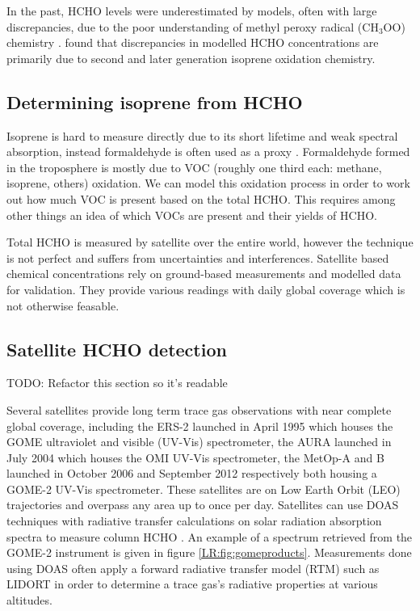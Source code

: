     In the past, HCHO levels were underestimated by models, often with large discrepancies, due to the poor understanding of methyl peroxy radical (CH$_3$OO) chemistry \citep{Wagner2002}.
    \cite{Marvin2017} found that discrepancies in modelled HCHO concentrations are primarily due to second and later generation isoprene oxidation chemistry.
    
  \subsection{Determining isoprene from HCHO}
    Isoprene is hard to measure directly due to its short lifetime and weak spectral absorption, instead formaldehyde is often used as a proxy \citep{Millet2006, Fu2007, Dufour2009, Marais2012, bauwens2013satellite, Kefauver2014, Bauwens2016}.
    Formaldehyde formed in the troposphere is mostly due to VOC (roughly one third each: methane, isoprene, others) oxidation.
    We can model this oxidation process in order to work out how much VOC is present based on the total HCHO.
    This requires among other things an idea of which VOCs are present and their yields of HCHO.
    
    
    Total HCHO is measured by satellite over the entire world, however the technique is not perfect and suffers from uncertainties and interferences.
    Satellite based chemical concentrations rely on ground-based measurements and modelled data for validation.
    They provide various readings with daily global coverage which is not otherwise feasable.
  
  \subsection{Satellite HCHO detection}
    TODO: Refactor this section so it's readable
    
    Several satellites provide long term trace gas observations with near complete global coverage, including the ERS-2 launched in April 1995 which houses the GOME ultraviolet and visible (UV-Vis) spectrometer, the AURA launched in July 2004 which houses the OMI UV-Vis spectrometer, the MetOp-A and B launched in October 2006 and September 2012 respectively both housing a GOME-2 UV-Vis spectrometer.
    These satellites are on Low Earth Orbit (LEO) trajectories and overpass any area up to once per day.
    Satellites can use DOAS techniques with radiative transfer calculations on solar radiation absorption spectra to measure column HCHO .
    An example of a spectrum retrieved from the GOME-2 instrument is given in figure \ref{LR:fig:gomeproducts}.
    Measurements done using DOAS often apply a forward radiative transfer model (RTM) such as LIDORT in order to determine a trace gas's radiative properties at various altitudes.
    
